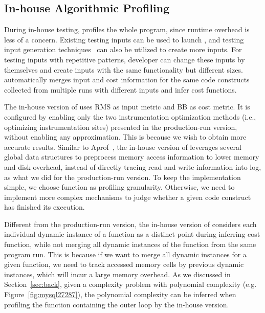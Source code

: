 \subsection{In-house Algorithmic Profiling}
\label{sec:in-house}

During in-house testing, \Tool profiles the whole program, 
since runtime overhead is less of a concern. 
Existing testing inputs can be used to launch \Tool, 
and testing input generation techniques~\cite{KLEE,dart,s2e} 
can also be utilized to create more inputs.
For testing inputs with repetitive patterns, 
developer can change these inputs by themselves 
and create inputs with the same functionality but different sizes. 
\Tool automatically merges input and cost information 
for the same code constructs
collected from multiple runs with different inputs and infer cost functions. 


The in-house version of \Tool uses RMS as input metric and BB
as cost metric.
It is configured by enabling
only the two instrumentation optimization methods (i.e.,
optimizing instrumentation sites) presented 
in the production-run version, without enabling any approximation. 
This is because we wish 
to obtain more accurate results.
Similar to Aprof~\cite{Aprof1,Aprof2}, 
the in-house version of \Tool leverages several global data structures
to preprocess memory access information to lower memory and disk overhead,
instead of directly tracing read and write information into log, 
as what we did for the production-run version. 
To keep the implementation simple, 
we choose function as profiling granularity.
Otherwise, we need to implement more complex 
mechanisms to judge whether a given code construct 
has finished its execution.  

Different from the production-run version, the in-house version of \Tool 
considers each individual dynamic instance of a function 
as a distinct point during inferring cost function, 
while not merging all dynamic instances of the function 
from the same program run.
This is because if we want to merge all dynamic instances for a given function, 
we need to track accessed memory cells by previous dynamic instances, 
which will incur a large memory overhead. 
As we discussed in Section~\ref{sec:back}, 
given a complexity problem with polynomial complexity 
(e.g. Figure~\ref{fig:mysql27287}),  
the polynomial complexity can be inferred when profiling 
the function containing the outer loop by the in-house version.

